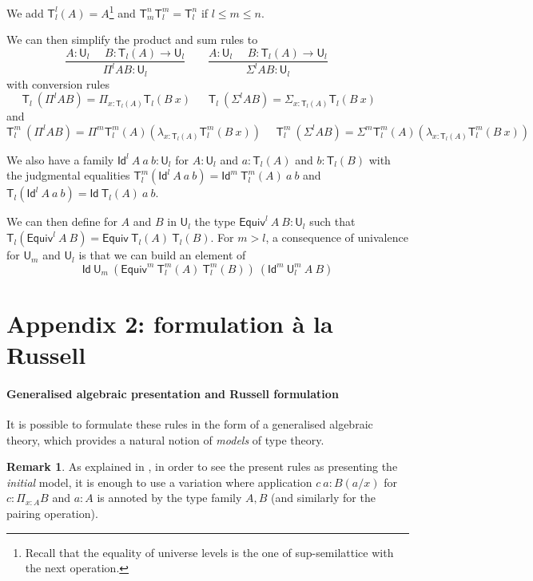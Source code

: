 \documentclass[11pt,a4paper]{article}
\theoremstyle{definition}
\newtheorem{remark}{Remark}
\newcommand{\Id}{\mathsf{Id}}
\newcommand{\UU}{\mathsf{U}}
\newcommand{\mypi}[3]{\Pi_{#1:#2}#3}
\newcommand{\mylam}[3]{\lambda_{#1:#2}#3}
\newcommand{\mysig}[3]{\Sigma_{#1:#2}#3}
\newcommand{\T}{\mathsf{T}}
\newcommand{\Equiv}{\mathsf{Equiv}}
\begin{document}
We add $\T_{l}^l(A) = A$\footnote{Recall that the equality of universe levels is the one of
  sup-semilattice with the next operation.}
and $\T_{m}^n\T_{l}^m = \T_l^n$ if $l\leqslant m\leqslant n$.

We can then simplify the product and sum rules to
$$
\frac{A:\UU_{l}~~~~~~B:\T_{l}(A)\rightarrow \UU_{l}}
     {\Pi^{l} A B:\UU_{l}}~~~~~~~~~
\frac{A:\UU_{l}~~~~~~B:\T_{l}(A)\rightarrow \UU_{l}}
     {\Sigma^{l} A B:\UU_{l}}~~~~~~~~~
$$
with conversion rules
$$
\T_{l}~(\Pi^{l} A B) = \mypi{x}{\T_{l}(A)}{ \T_{l}(B~x)}~~~~~~~
\T_{l}~(\Sigma^{l} A B) =  \mysig{x}{\T_{l}(A)}{ \T_{l}(B~x)}~~~~~~~
$$
and
$$
\T_{l}^{m}~(\Pi^{l} A B) = \Pi^{m} \T_{l}^{m}(A) (\mylam {x}{\T_{l}(A)}{\T_{l}^{m}(B~x)})~~~~~~
\T_{l}^{m}~(\Sigma^{l} A B) = \Sigma^{m} \T_{l}^{m}(A) (\mylam {x}{\T_{l}(A)}{\T_{l}^{m}(B~x)})~~~~~~
$$

We also have a family $\Id^l~A~a~b:\UU_l$ for $A:\UU_l$ and $a:\T_l(A)$ and $b:\T_l(B)$
with the judgmental equalities $\T_l^m(\Id^l~A~a~b) = \Id^m~\T_l^m(A)~a~b$
and $\T_l(\Id^l~A~a~b) = \Id~\T_l(A)~a~b$.

\medskip

We can then define for $A$ and $B$ in $\UU_l$
the type $\Equiv^l~A~B:\UU_l$ such that
$\T_l(\Equiv^l~A~B) = \Equiv~\T_l(A)~\T_l(B)$. For $m>l$, a consequence of univalence
for $\UU_m$ and $\UU_l$ is that we can build an element of
$$
\Id~\UU_m~(\Equiv^m~\T^m_l(A)~\T^m_l(B))~(\Id^m~\UU^m_l~A~B)
$$

\section*{Appendix 2: formulation \`a la Russell}

\paragraph{Generalised algebraic presentation and Russell formulation}

It is possible to formulate these rules in the form of a generalised algebraic theory, which provides
a natural notion of {\em models} of type theory.

\begin{remark} \label{app:annotation}
As explained
in \cite{streicher:semtt}, in order to see the present rules as presenting the {\em initial} model,
it is enough to use a variation where application $c~a:B(a/x)$ for $c:\mypi{x}{A}B$ and $a:A$
is annoted by the type family $A,B$ (and similarly for the pairing operation).
\end{remark}
\end{document}
